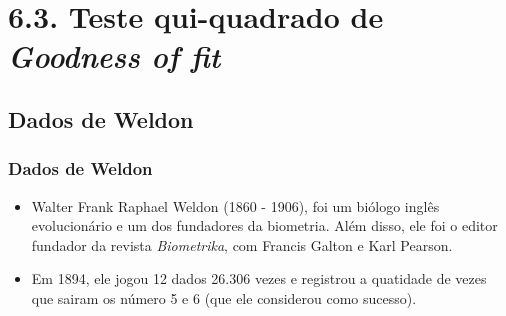 
\section{6.3. Teste qui-quadrado de \textit{Goodness of fit}}


\subsection{Dados de Weldon}


\begin{frame}
\frametitle{Dados de Weldon}

{
\begin{itemize}
\justifying
\small
\item Walter Frank Raphael Weldon (1860 - 1906), foi um biólogo inglês evolucionário e um dos fundadores da biometria. Além disso, ele foi o editor fundador da revista \textit{Biometrika}, com Francis Galton e Karl Pearson.
\justifying
\item Em 1894, ele jogou 12 dados 26.306 vezes e registrou a quatidade de vezes que sairam os número 5 e 6 (que ele considerou como sucesso).


\end{itemize}}
\end{frame}
